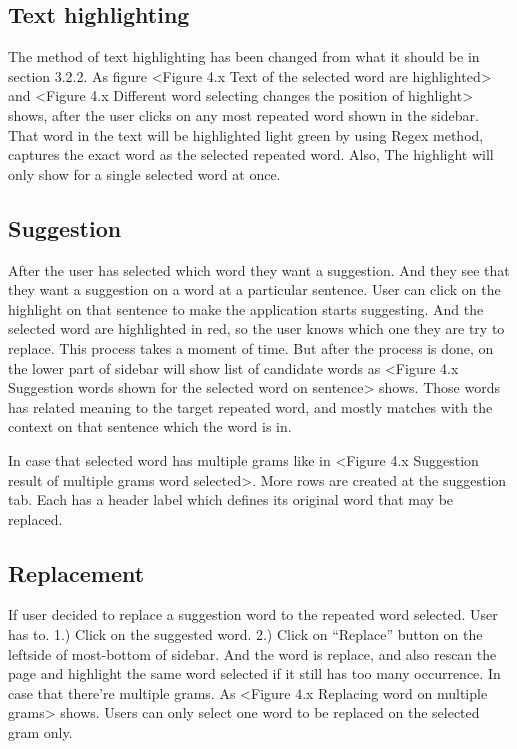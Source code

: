 \documentclass[12pt,oneside,openright,a4paper]{cpe-english-project}
\begin{document}
\subsection{Text highlighting}
The method of text highlighting has been changed from what it should be in section 3.2.2. As figure <Figure 4.x Text of the selected word are highlighted> and <Figure 4.x Different word selecting changes the position of highlight> shows, after the user clicks on any most repeated word shown in the sidebar. That word in the text will be highlighted light green by using Regex method, captures the exact word as the selected repeated word. Also, The highlight will only show for a single selected word at once.

\subsection{Suggestion}
After the user has selected which word they want a suggestion. And they see that they want a suggestion on a word at a particular sentence. User can click on the highlight on that sentence to make the application starts suggesting. And the selected word are highlighted in red, so the user knows which one they are try to replace. This process takes a moment of time. But after the process is done, on the lower part of sidebar will show list of candidate words as <Figure 4.x Suggestion words shown for the selected word on sentence> shows. Those words has related meaning to the target repeated word, and mostly matches with the context on that sentence which the word is in.

	In case that selected word has multiple grams like in <Figure 4.x Suggestion result of multiple grams word selected>. More rows are created at the suggestion tab. Each has a header label which defines its original word that may be replaced. 


\subsection{Replacement}
If user decided to replace a suggestion word to the repeated word selected. User has to. 1.) Click on the suggested word. 2.) Click on “Replace” button on the leftside of most-bottom of sidebar. And the word is replace, and also rescan the page and highlight the same word selected if it still has too many occurrence. In case that there’re multiple grams. As <Figure 4.x Replacing word on multiple grams> shows. Users can only select one word to be replaced on the selected gram only.
\end{document}
